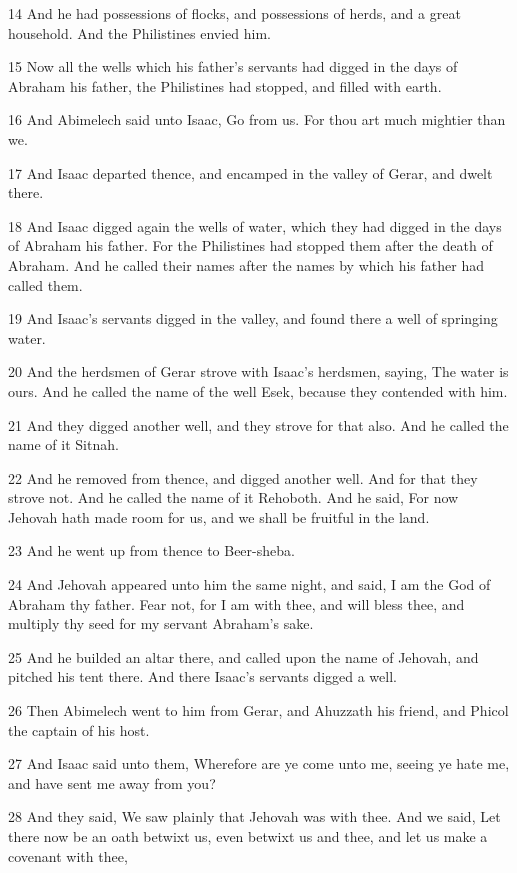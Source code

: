 \par 14 And he had possessions of flocks, and possessions of herds, and a great household. And the Philistines envied him.
\par 15 Now all the wells which his father's servants had digged in the days of Abraham his father, the Philistines had stopped, and filled with earth.
\par 16 And Abimelech said unto Isaac, Go from us. For thou art much mightier than we.
\par 17 And Isaac departed thence, and encamped in the valley of Gerar, and dwelt there.
\par 18 And Isaac digged again the wells of water, which they had digged in the days of Abraham his father. For the Philistines had stopped them after the death of Abraham. And he called their names after the names by which his father had called them.
\par 19 And Isaac's servants digged in the valley, and found there a well of springing water.
\par 20 And the herdsmen of Gerar strove with Isaac's herdsmen, saying, The water is ours. And he called the name of the well Esek, because they contended with him.
\par 21 And they digged another well, and they strove for that also. And he called the name of it Sitnah.
\par 22 And he removed from thence, and digged another well. And for that they strove not. And he called the name of it Rehoboth. And he said, For now Jehovah hath made room for us, and we shall be fruitful in the land.
\par 23 And he went up from thence to Beer-sheba.
\par 24 And Jehovah appeared unto him the same night, and said, I am the God of Abraham thy father. Fear not, for I am with thee, and will bless thee, and multiply thy seed for my servant Abraham's sake.
\par 25 And he builded an altar there, and called upon the name of Jehovah, and pitched his tent there. And there Isaac's servants digged a well.
\par 26 Then Abimelech went to him from Gerar, and Ahuzzath his friend, and Phicol the captain of his host.
\par 27 And Isaac said unto them, Wherefore are ye come unto me, seeing ye hate me, and have sent me away from you?
\par 28 And they said, We saw plainly that Jehovah was with thee. And we said, Let there now be an oath betwixt us, even betwixt us and thee, and let us make a covenant with thee,
